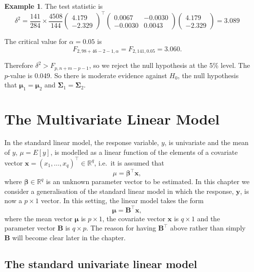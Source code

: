 \documentclass[]{book}
\theoremstyle{definition}
\theoremstyle{definition}
\newtheorem{example}{Example}[chapter]
\theoremstyle{definition}
\theoremstyle{remark}
\begin{document}
\begin{example}
The test statistic is
\[\delta^2 = \frac{141}{284} \times \frac{4508}{144} \begin{pmatrix} 4.179 \\ -2.329 \end{pmatrix}^\top \begin{pmatrix} 0.0067 & -0.0030 \\ -0.0030 & 0.0043 \end{pmatrix} \begin{pmatrix} 4.179 \\ -2.329 \end{pmatrix}
= 3.089\]

The critical value for \(\alpha=0.05\) is
\[F_{2,98+46-2-1,\alpha} = F_{2,141,0.05} = 3.060.\]

Therefore \(\delta^2 > F_{p,n+m-p-1}\), so we reject the null hypothesis at the 5\% level. The \(p\)-value is 0.049. So there is moderate evidence against \(H_0\), the null hypothesis that \(\boldsymbol \mu_1=\boldsymbol \mu_2\) and \(\boldsymbol \Sigma_1=\boldsymbol \Sigma_2\).
\end{example}

\hypertarget{the-multivariate-linear-model}{%
\chapter{The Multivariate Linear Model}\label{the-multivariate-linear-model}}

In the standard linear model, the response variable, \(y\), is univariate and the mean of \(y\), \(\mu=E[y]\), is modelled as a linear function of the elements of a covariate vector \(\boldsymbol x=(x_1, \ldots , x_q)^\top \in \mathbb{R}^q\), i.e.~it is assumed that
\[
\mu = {\pmb \beta}^\top \boldsymbol x,
\]
where \({\pmb \beta} \in \mathbb{R}^q\) is an unknown parameter vector to be estimated. In this chapter we consider a generalisation of the standard linear model in which the response, \(\boldsymbol y\), is now a \(p \times 1\) vector. In this setting, the linear model takes the form
\[
{\pmb \mu}=\boldsymbol B^\top \boldsymbol x,
\]
where the mean vector \(\boldsymbol \mu\) is \(p \times 1\), the covariate vector \(\boldsymbol x\) is \(q \times 1\) and the parameter vector \(\boldsymbol B\) is \(q \times p\). The reason for having \(\boldsymbol B^\top\) above rather than simply \(\boldsymbol B\) will become clear later in the chapter.

\hypertarget{the-standard-univariate-linear-model}{%
\section{The standard univariate linear model}\label{the-standard-univariate-linear-model}}
\end{document}
